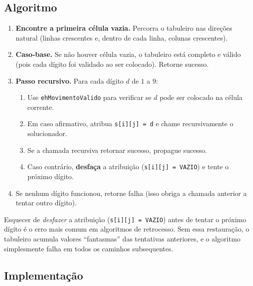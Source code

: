 \documentclass[11pt,a4paper,oneside]{report}
\newcommand{\codigo}[1]{\texttt{\color{deitelblue}#1}}
\begin{document}
\subsection{Algoritmo}

\begin{enumerate}
    \item \textbf{Encontre a primeira célula vazia.} Percorra o tabuleiro
        nas direções natural (linhas crescentes e, dentro de cada linha,
        colunas crescentes).
    \item \textbf{Caso-base.} Se não houver célula vazia, o tabuleiro está
        completo e válido (pois cada dígito foi validado ao ser colocado).
        Retorne sucesso.
    \item \textbf{Passo recursivo.} Para cada dígito $d$ de $1$ a $9$:
        \begin{enumerate}
            \item Use \codigo{ehMovimentoValido} para verificar se $d$ pode
                  ser colocado na célula corrente.
            \item Em caso afirmativo, atribua \codigo{s[i][j] = d} e chame
                  recursivamente o solucionador.
            \item Se a chamada recursiva retornar sucesso, propague sucesso.
            \item Caso contrário, \textbf{desfaça} a atribuição
                  (\codigo{s[i][j] = VAZIO}) e tente o próximo dígito.
        \end{enumerate}
    \item Se nenhum dígito funcionou, retorne falha (isso obriga a chamada
        anterior a tentar outro dígito).
\end{enumerate}

\begin{erro}
Esquecer de \emph{desfazer} a atribuição (\codigo{s[i][j] = VAZIO}) antes
de tentar o próximo dígito é o erro mais comum em algoritmos de retrocesso.
Sem essa restauração, o tabuleiro acumula valores ``fantasmas'' das
tentativas anteriores, e o algoritmo simplesmente falha em todos os
caminhos subsequentes.
\end{erro}

\subsection{Implementação}
\end{document}
